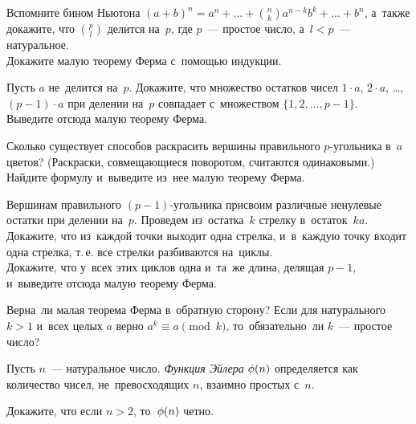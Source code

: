 \begin{problems}

\item
\subproblem
Вспомните бином Ньютона
\(
    (a + b)^{n}
=
    a^{n} + \ldots + \binom{n}{k} a^{n-k} b^{k} + \ldots + b^{n}
\),
а~также докажите, что $\binom{p}{l}$ делится на~$p$, где $p$~--- простое число,
а~$l < p$~--- натуральное.
\\
\subproblem
Докажите малую теорему Ферма с~помощью индукции.

\item%
\label{/algebra/number-theory/ferma-euler-theorem-g8/1-r1/:problem:proof-2}%
\subproblem
Пусть $a$ не~делится на~$p$.
Докажите, что множество остатков чисел
$1 \cdot a$, $2\cdot a$, \ldots, $(p - 1) \cdot a$ при делении на~$p$ совпадает
с~множеством $\{ 1, 2, \ldots, p - 1 \}$.
\\
\subproblem
Выведите отсюда малую теорему Ферма.

\item
Сколько существует способов раскрасить вершины правильного $p$-угольника
в~$a$ цветов?
(Раскраски, совмещающиеся поворотом, считаются одинаковыми.)
Найдите формулу и~выведите из~нее малую теорему Ферма.

\item
\label{/algebra/number-theory/ferma-euler-theorem-g8/1-r1/:problem:proof-4}%
Вершинам правильного $(p - 1)$-угольника присвоим различные ненулевые остатки
при делении на~$p$.
Проведем из~остатка~$k$ стрелку в~остаток~$k a$.
\\
\subproblem
Докажите, что из~каждой точки выходит одна стрелка, и~в~каждую точку входит
одна стрелка, т.\,е. все стрелки разбиваются на~циклы.
\\
\subproblem
Докажите, что у~всех этих циклов одна и~та~же длина, делящая $p - 1$,
и~выведите отсюда малую теорему Ферма.

\item
Верна~ли малая теорема Ферма в~обратную сторону?
Если для натурального $k > 1$ и~всех целых $a$ верно $a^{k} \equiv a \pmod k$,
то~обязательно~ли $k$~--- простое число?

\end{problems}

Пусть $n$~--- натуральное число.
\emph{Функция Эйлера} $\phi(n)$ определяется как количество чисел,
не~превосходящих $n$, взаимно простых с~$n$.

Докажите, что если $n > 2$, то~$\phi(n)$ четно.

